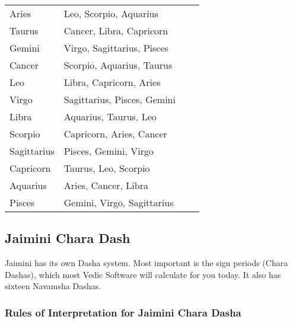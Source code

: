  
\begin{center}
\begin{tabular}{ l l l l}
Aries	& Leo, Scorpio, Aquarius                \\


Taurus	 &Cancer, Libra, Capricorn                \\
 

Gemini	 &Virgo, Sagittarius, Pisces                \\
 

Cancer	& Scorpio, Aquarius, Taurus                \\
 

Leo	& Libra, Capricorn, Aries                \\
 

Virgo	 &Sagittarius, Pisces, Gemini                \\
 

Libra	 &Aquarius, Taurus, Leo                \\
 

Scorpio	 &Capricorn, Aries, Cancer                \\
 

Sagittarius	& Pisces, Gemini, Virgo                \\
 

Capricorn	 &Taurus, Leo, Scorpio                \\
 

Aquarius	 &Aries, Cancer, Libra                \\
 

Pisces	 &Gemini, Virgo, Sagittarius                \\
 
 \end{tabular}
\end{center}
 

\subsection{Jaimini Chara Dash}
 

Jaimini has its own Dasha system. Most important is the sign periods (Chara Dashas), which most Vedic Software will calculate for you today. It also has sixteen Navamsha Dashas. 

 

\subsubsection{Rules of Interpretation for Jaimini Chara Dasha}


